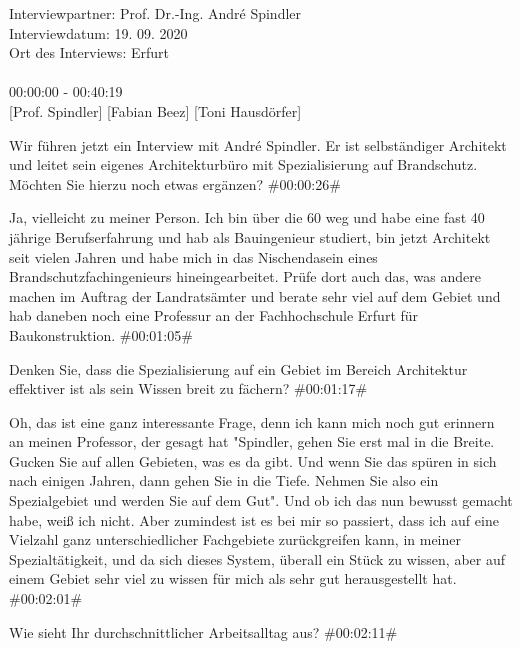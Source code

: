 Interviewpartner: \hfill Prof. Dr.-Ing. André Spindler\\
Interviewdatum: \hfill 19. 09. 2020\\
Ort des Interviews: \hfill Erfurt\\\\
00:00:00 - 00:40:19\\

\footnotesize
{}[Prof. Spindler]
[Fabian Beez]
[Toni Hausdörfer]
\addtolength{\transcriptlen}{1em}

\begin{description}

\Fabian Wir führen jetzt ein Interview mit André Spindler. Er ist selbständiger Architekt und leitet sein eigenes Architekturbüro mit Spezialisierung auf Brandschutz. Möchten Sie hierzu noch etwas ergänzen? \#00:00:26\#

\Andre Ja, vielleicht zu meiner Person. Ich bin über die 60 weg und habe eine fast 40 jährige Berufserfahrung und hab als Bauingenieur studiert, bin jetzt Architekt seit vielen Jahren und habe mich in das Nischendasein eines Brandschutzfachingenieurs hineingearbeitet. Prüfe dort auch das, was andere machen im Auftrag der Landratsämter und berate sehr viel auf dem Gebiet und hab daneben noch eine Professur an der Fachhochschule Erfurt für Baukonstruktion. \#00:01:05\#

\Fabian Denken Sie, dass die Spezialisierung auf ein Gebiet im Bereich Architektur effektiver ist als sein Wissen breit zu fächern? \#00:01:17\#

\Andre Oh, das ist eine ganz interessante Frage, denn ich kann mich noch gut erinnern an meinen Professor, der gesagt hat "Spindler, gehen Sie erst mal in die Breite. Gucken Sie auf allen Gebieten, was es da gibt. Und wenn Sie das spüren in sich nach einigen Jahren, dann gehen Sie in die Tiefe. Nehmen Sie also ein Spezialgebiet und werden Sie auf dem Gut". Und ob ich das nun bewusst gemacht habe, weiß ich nicht. Aber zumindest ist es bei mir so passiert, dass ich auf eine Vielzahl ganz unterschiedlicher Fachgebiete zurückgreifen kann, in meiner Spezialtätigkeit, und da sich dieses System, überall ein Stück zu wissen, aber auf einem Gebiet sehr viel zu wissen für mich als sehr gut herausgestellt hat. \#00:02:01\#

\Fabian Wie sieht Ihr durchschnittlicher Arbeitsalltag aus? \#00:02:11\#


\end{description}
